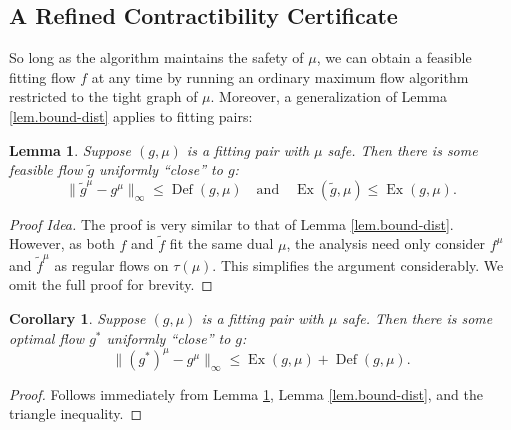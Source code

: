 \documentclass[11pt]{article}
\newtheorem{corollary}{Corollary}[theorem]
\newtheorem{lemma}[theorem]{Lemma}
\theoremstyle{definition}
\theoremstyle{definition}
\theoremstyle{definition}
\newcommand{\fu}{f^{\mu}}
\newcommand{\nfiu}{\nabla \fu_i}
\newcommand{\biu}{b_{i}^{\mu}}
\newcommand{\din}{\delta^{\text{in}}}
\newcommand{\dout}{\delta^{\text{out}}}
\DeclareMathOperator{\Ex}{Ex}
\DeclareMathOperator{\Def}{Def}
\begin{document}
    
    \subsection{A Refined Contractibility Certificate}\label{sec:contract-cert}
    So long as the algorithm maintains the safety of $\mu$,
    we can obtain a feasible fitting flow $f$ at any time
    by running an ordinary maximum flow algorithm restricted to the tight graph of $\mu$.
    Moreover, a generalization of Lemma \ref{lem.bound-dist} applies to fitting
    pairs:
    \begin{lemma} \label{lem.bound-dist1.5}
    Suppose $(g, \mu)$ is a fitting pair with $\mu$ safe. Then there is some feasible flow $\tilde{g}$
    uniformly ``close'' to $g$:
    \[ \|\tilde{g}^\mu - g^\mu\|_\infty \leq \Def(g, \mu) \quad \text{and} \quad
       \Ex(\tilde{g}, \mu) \leq \Ex(g, \mu). \]
    \end{lemma}
    \begin{proof}[Proof Idea]
    The proof is very similar to that of Lemma \ref{lem.bound-dist}. However, as both $f$ and
    $\tilde{f}$ fit the same dual $\mu$, the analysis need only consider $f^\mu$ and $\tilde{f}^\mu$
    as regular flows on $\tau(\mu)$. This simplifies the argument considerably. We omit the full proof
    for brevity.
    \end{proof}
    \begin{corollary} \label{lem.bound-dist2}
    Suppose $(g, \mu)$ is a fitting pair with $\mu$ safe. Then there is some optimal flow $g^*$
    uniformly ``close'' to $g$:
    \[ \|(g^*)^\mu - g^\mu\|_\infty \leq \Ex(g, \mu) + \Def(g, \mu). \]
    \end{corollary}
    \begin{proof}
    Follows immediately from Lemma \ref{lem.bound-dist1.5}, Lemma \ref{lem.bound-dist},
    and the triangle inequality.
    \end{proof}
    
\end{document}
